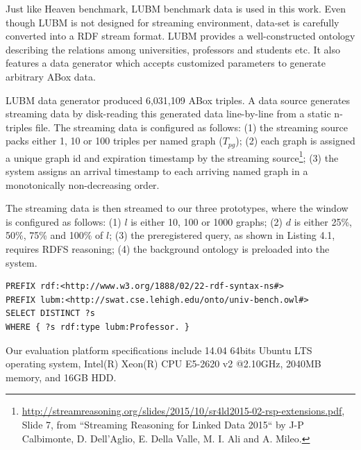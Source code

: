 Just like Heaven benchmark, LUBM benchmark\cite{guo2005lubm} data is used in this work. 
Even though LUBM is not designed for streaming environment, data-set is carefully converted into a RDF stream format. 
LUBM provides a well-constructed ontology describing the relations among universities, professors and students etc.
It also features a data generator which accepts customized parameters to generate arbitrary ABox data.

LUBM data generator produced 6,031,109 ABox triples. 
A data source generates streaming data by disk-reading this generated data line-by-line from a static n-triples file.
The streaming data is configured  as follows:
(1) the streaming source packs either 1, 10 or 100 triples per named graph ($T_{pg}$);
(2) each graph is assigned a unique graph id and expiration timestamp by the streaming source\footnote{\url{http://streamreasoning.org/slides/2015/10/sr4ld2015-02-rsp-extensions.pdf}, Slide 7, from ``Streaming Reasoning for Linked Data 2015`` by J-P Calbimonte, D. Dell'Aglio, E. Della Valle, M. I. Ali and A. Mileo.};
(3) the system assigns an arrival timestamp to each arriving named graph in a monotonically non-decreasing order.

The streaming data is then streamed to our three prototypes, where the window is configured as follows:
(1) $l$ is either 10, 100 or 1000 graphs;
(2) $d$ is either 25\%, 50\%, 75\% and 100\% of $l$;
(3) the preregistered query, as shown in Listing 4.1, requires RDFS reasoning;
(4) the background ontology is preloaded into the system.

\begin{lstlisting}[language=SPARQL,caption=SPARQL Query,basicstyle=\small,frame=single]
PREFIX rdf:<http://www.w3.org/1888/02/22-rdf-syntax-ns#>
PREFIX lubm:<http://swat.cse.lehigh.edu/onto/univ-bench.owl#>
SELECT DISTINCT ?s
WHERE { ?s rdf:type lubm:Professor. }
\end{lstlisting}

Our evaluation platform specifications include 14.04 64bits Ubuntu LTS operating system, Intel(R) Xeon(R) CPU E5-2620 v2 @2.10GHz, 2040MB memory, and 16GB HDD. 

